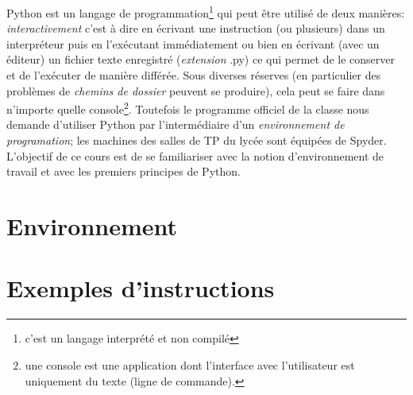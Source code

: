 

\usepackage{parcolumns}
\setlength{\parindent}{0pt}

 
Python est un langage de programmation\footnote{c'est un langage interprété et non compilé} qui peut être utilisé de deux manières: 
\emph{interactivement} c'est à dire en écrivant une instruction (ou plusieurs) dans un interpréteur puis en l'exécutant immédiatement ou bien en écrivant (avec un éditeur) un fichier texte enregistré (\emph{extension} .py) ce qui permet de le conserver et de l'exécuter de manière différée.\newline
Sous diverses réserves (en particulier des problèmes de \emph{chemins de dossier} peuvent se produire), cela peut se faire dans n'importe quelle console\footnote{une console est une application dont l'interface avec l'utilisateur est uniquement du texte (ligne de commande).}. Toutefois le programme officiel de la classe nous demande d'utiliser Python par l'intermédiaire d'un \emph{environnement de programation}; les machines des salles de TP du lycée sont équipées de Spyder.\newline
L'objectif de ce cours est de se familiariser avec la notion d'environnement de travail et avec les premiers principes de Python.

\section{Environnement}


\section{Exemples d'instructions}


